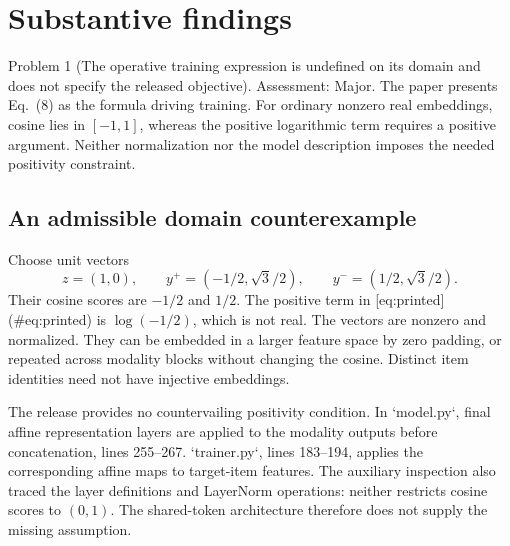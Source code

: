 \documentclass[10pt]{article}
\begin{document}
\section*{Substantive findings}
Problem 1 (The operative training expression is undefined on its domain and does not specify the released objective).  Assessment: Major. The paper presents Eq. (8) as the formula driving training. For ordinary nonzero real embeddings, cosine lies in \([-1,1]\), whereas the positive logarithmic term requires a positive argument. Neither normalization nor the model description imposes the needed positivity constraint.\par
\subsection*{An admissible domain counterexample}
Choose unit vectors \[z=(1,0),\qquad
y^+=(-1/2,\sqrt3/2),\qquad
y^-=(1/2,\sqrt3/2).\] Their cosine scores are \(-1/2\) and \(1/2\). The positive term in [eq:printed] (\#eq:printed) is \(\log(-1/2)\), which is not real. The vectors are nonzero and normalized. They can be embedded in a larger feature space by zero padding, or repeated across modality blocks without changing the cosine. Distinct item identities need not have injective embeddings.\par
The release provides no countervailing positivity condition. In `model.py`, final affine representation layers are applied to the modality outputs before concatenation, lines 255–267. `trainer.py`, lines 183–194, applies the corresponding affine maps to target-item features. The auxiliary inspection also traced the layer definitions and LayerNorm operations: neither restricts cosine scores to \((0,1)\). The shared-token architecture therefore does not supply the missing assumption.\par
\end{document}
